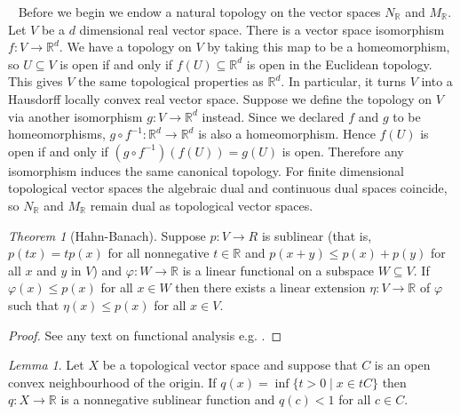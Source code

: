 \documentclass[BSc]{usydthesis}
\numberwithin{equation}{chapter}
\theoremstyle{remark}
\newtheorem{Theorem}[equation]{Theorem}
\newtheorem{Lemma}[equation]{Lemma}
\newcommand{\R}{\mathbb{R}}
\begin{document}
~
Before we begin we endow a natural topology on the vector spaces $N_{\R}$ and $M_{\R}.$ Let $V$ be a $d$ dimensional real vector space. There is a vector space isomorphism $f:V \to \R^d.$ We have a topology on $V$ by taking this map to be a homeomorphism, so $U\subseteq V$ is open if and only if $f(U)\subseteq \R^d$ is open in the Euclidean topology. This gives $V$ the same topological properties as $\R^d.$ In particular, it turns $V$ into a Hausdorff locally convex real vector space. Suppose we define the topology on $V$ via another isomorphism $g:V\to \R^d$ instead. Since we declared $f$ and $g$ to be homeomorphisms, $g\circ f^{-1} : \R^d \to \R^d$ is also a homeomorphism. Hence $f(U)$ is open if and only if $ (g\circ f^{-1}) (f(U)) = g(U)$ is open. Therefore any isomorphism induces the same canonical topology. For finite dimensional topological vector spaces the algebraic dual and continuous dual spaces coincide, so $N_{\R}$ and $M_{\R}$ remain dual as topological vector spaces. 

\begin{Theorem}[Hahn-Banach]\label{HB} Suppose $p:V \to R$ is sublinear (that is, $p(tx) = t p(x)$ for all nonnegative $t\in \R$ and $p(x+y)\leq p(x) + p(y)$ for all $x$ and $y$ in $V$) and $\varphi:W\to \R$ is a linear functional on a subspace $W\subseteq V.$ If $\varphi(x) \leq p(x)$ for all $x\in W$ then there exists a linear extension $\eta: V \to \R$ of $\varphi$ such that $\eta(x)\leq p(x)$ for all $x\in V.$ 
\end{Theorem}

\begin{proof} See any text on functional analysis e.g. \cite[p.~ 77]{Conway} . \end{proof}

 
\begin{Lemma} \label{Minkowski sublinear} Let $X$ be a topological vector space and suppose that $C$ is an open convex neighbourhood of the origin. If $q(x)= \inf \{t>0\mid x\in tC \}$ then $q:X\to \R$ is a nonnegative sublinear function and $q(c)<1$ for all $c\in C.$
\end{Lemma}
\end{document}
